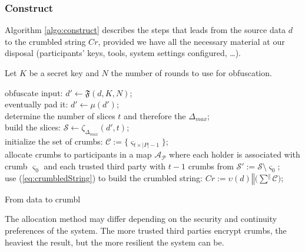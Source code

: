 \documentclass[twoside,twocolumn]{article}
\theoremstyle{definition}
\theoremstyle{remark}
\begin{document}
\subsubsection{Construct}

Algorithm \ref{algo:construct} describes the steps that leads from the source data $d$ to the crumbled string $Cr$, provided we have all the necessary 
material at our disposal (participants' keys, tools, system settings configured, \dots).

Let $K$ be a secret key and $N$ the number of rounds to use for obfuscation.
\begin{algorithm}
    obfuscate input: $d' \gets \mathfrak{F}(d, K, N)$; \\
    eventually pad it: $d' \gets \mu(d')$; \\
    determine the number of slices $t$ and therefore the $\Delta_{max}$; \\
    build the slices: $\mathcal{S} \gets \zeta_{\Delta_{max}}(d', t)$; \\
    initialize the set of crumbs: $\mathcal{C} := \{ \varsigma_{t \times |P| - 1} \}$; \\
    allocate crumbs to participants in a map $\mathcal{A_P}$ where each holder is associated with crumb $\varsigma_0$ and each trusted third party with 
    $t - 1$ crumbs from $\mathcal{S}' := \mathcal{S} \setminus \varsigma_0$; \\
    use (\ref{eq:crumbledString}) to build the crumbled string: $Cr := \upsilon(d) \mathbin\Vert \Big( \sum^{\mathbin\Vert} \mathcal{C} \Big)$; \\
    \caption{From data to crumbl}
    \label{algo:construct}
\end{algorithm}

The allocation method may differ depending on the security and continuity preferences of the system. The more trusted third parties encrypt crumbs, the 
heaviest the result, but the more resilient the system can be.


\end{document}
